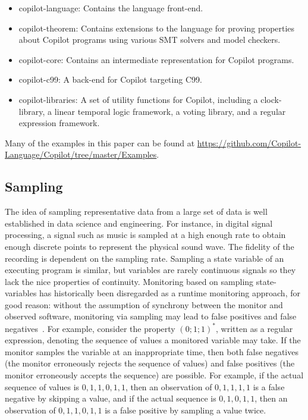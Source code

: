 \begin{itemize}
\item copilot-language: Contains the language front-end.
\item copilot-theorem: Contains extensions to the language for proving
properties about Copilot programs using various SMT solvers and model checkers.
\item copilot-core: Contains an intermediate representation for Copilot programs.
\item copilot-c99: A back-end for Copilot targeting C99.
\item copilot-libraries: A set of utility functions for Copilot, including a
clock-library, a linear temporal logic framework, a voting library, and a regular
expression framework.
\end{itemize}

Many of the examples in this paper can be found at
\url{https://github.com/Copilot-Language/Copilot/tree/master/Examples}.

\subsection{Sampling} \label{sampling}
 The idea of sampling representative data from a large set of data  is well
established in data science and engineering.
%
 For instance, in digital signal processing, a signal such as music is sampled
at a high enough rate to obtain enough discrete points to represent the
physical sound wave.
%
 The fidelity of the recording is dependent on the sampling rate.
%
 Sampling a state variable of an executing program is similar, but variables
are rarely continuous signals so they lack the nice properties of continuity.
%
Monitoring based on sampling state-variables has historically been disregarded
as a runtime monitoring approach, for good reason: without the assumption of
synchrony between the monitor and observed software, monitoring via sampling
may lead to false positives and false negatives~\cite{DwyerDE08}.
%
 For example, consider the property $(0;1;1)^*$, written as a regular
expression, denoting the sequence of values a monitored variable may take.
%
 If the monitor samples the variable at an inappropriate time, then both false
negatives (the monitor erroneously rejects the sequence of values) and false
positives (the monitor erroneously accepts the sequence) are possible. 
%
 For example, if the actual sequence of values is $0,1,1,0,1,1$, then an
observation of $0,1,1,1,1$ is a false negative by skipping a value, and if the
actual sequence is $0,1,0,1,1$, then an observation of $0,1,1,0,1,1$ is a false
positive by sampling a value twice.
%


